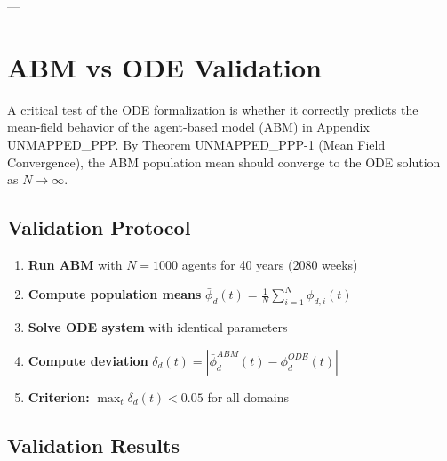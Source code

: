 ---


\section{ABM vs ODE Validation}
\label{ooo:validation}

\begin{tcolorbox}[colback=blue!5!white, colframe=blue!75!black, title=Validation Framework]
A critical test of the ODE formalization is whether it correctly predicts the
mean-field behavior of the agent-based model (ABM) in Appendix UNMAPPED_PPP.
By Theorem UNMAPPED_PPP-1 (Mean Field Convergence), the ABM population mean should
converge to the ODE solution as $N \to \infty$.
\end{tcolorbox}

\subsection{Validation Protocol}

\begin{enumerate}
\item \textbf{Run ABM} with $N = 1000$ agents for 40 years (2080 weeks)
\item \textbf{Compute population means} $\bar{\phi}_d(t) = \frac{1}{N}\sum_{i=1}^N \phi_{d,i}(t)$
\item \textbf{Solve ODE system} with identical parameters
\item \textbf{Compute deviation} $\delta_d(t) = |\bar{\phi}_d^{ABM}(t) - \phi_d^{ODE}(t)|$
\item \textbf{Criterion:} $\max_t \delta_d(t) < 0.05$ for all domains
\end{enumerate}

\subsection{Validation Results}

